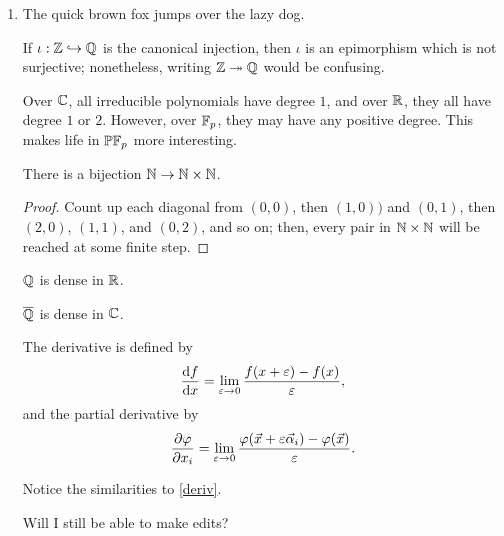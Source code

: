 \documentclass[onesided]{../ccg-pset}
\author{Colton Grainger}
\date{\today}
\begin{document}
\maketitle

\begin{enumerate}
\item
	\label{first}
	The quick brown fox jumps over the lazy dog.

	\begin{thm}
	If \(\iota:\mathbb Z\hookrightarrow\mathbb Q\) is the canonical injection, then \(\iota\) is an epimorphism which is not surjective;
	nonetheless, writing \(\mathbb Z\twoheadrightarrow\mathbb Q\) would be confusing.
	\end{thm}

	Over \(\mathbb C\), all irreducible polynomials have degree \(1\), and over \(\mathbb R\), they all have degree \(1\) or \(2\).
	However, over \(\mathbb F_p\), they may have any positive degree. This makes life in \(\mathbb P\mathbb F_p\) more interesting.

	\begin{lem}
	There is a bijection \(\mathbb N\to\mathbb N\times\mathbb N\).
	\end{lem}

	\begin{proof}
	Count up each diagonal from \((0,0)\), then \((1,0))\) and \((0,1)\), then \((2,0)\), \((1,1)\), and \((0,2)\), and
	so on; then, every pair in \(\mathbb N\times\mathbb N\) will be reached at some finite step.
	\end{proof}

	\begin{claim}
	\(\mathbb Q\) is dense in \(\mathbb R\).
	\end{claim}

	\begin{claim*}
	\(\overline{\mathbb Q}\) is dense in \(\mathbb C\).
	\end{claim*}

	The derivative is defined by
	\begin{equation}
	\label{deriv}
		\dv{f}{x} = \lim_{\varepsilon\to 0} \frac{f(x+\varepsilon) - f(x)}{\varepsilon},
	\end{equation}
	and the partial derivative by
	\begin{equation}
		\pdv{\varphi}{x_i} = \lim_{\varepsilon\to 0} \frac{\varphi(\vec x+\varepsilon \vec\alpha_i) - \varphi(\vec x)}{\varepsilon}.
	\end{equation}

	Notice the similarities to \eqref{deriv}.

	Will I still be able to make edits?


\end{enumerate}
\end{document}
